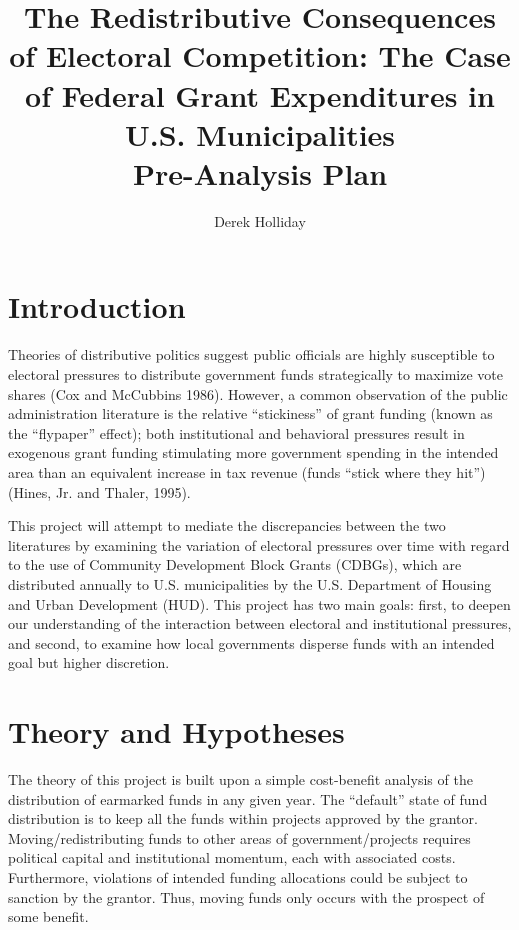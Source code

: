 \documentclass[12pt,a4paper]{article}
\begin{document}
\title{%
	The Redistributive Consequences of Electoral Competition: The Case of Federal Grant Expenditures in U.S. Municipalities \\
	\large Pre-Analysis Plan}

\author{Derek Holliday}

\maketitle

\section{Introduction}
\par Theories of distributive politics suggest public officials are highly susceptible to electoral pressures to distribute government funds strategically to maximize vote shares (Cox and McCubbins 1986). However, a common observation of the public administration literature is the relative ``stickiness'' of grant funding (known as the ``flypaper'' effect); both institutional and behavioral pressures result in exogenous grant funding stimulating more government spending in the intended area than an equivalent increase in tax revenue (funds ``stick where they hit'') (Hines, Jr. and Thaler, 1995).

\par This project will attempt to mediate the discrepancies between the two literatures by examining the variation of electoral pressures over time with regard to the use of Community Development Block Grants (CDBGs), which are distributed annually to U.S. municipalities by the U.S. Department of Housing and Urban Development (HUD). This project has two main goals: first, to deepen our understanding of the interaction between electoral and institutional pressures, and second, to examine how local governments disperse funds with an intended goal but higher discretion.

\section{Theory and Hypotheses}
\par The theory of this project is built upon a simple cost-benefit analysis of the distribution of earmarked funds in any given year. The ``default'' state of fund distribution is to keep all the funds within projects approved by the grantor. Moving/redistributing funds to other areas of government/projects requires political capital and institutional momentum, each with associated costs. Furthermore, violations of intended funding allocations could be subject to sanction by the grantor. Thus, moving funds only occurs with the prospect of some benefit.
\end{document}
